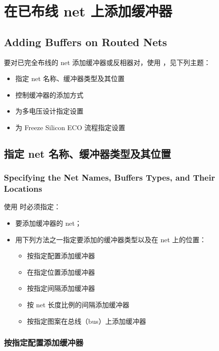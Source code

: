 \section{在已布线 net 上添加缓冲器}
\subsection*{Adding Buffers on Routed Nets}

要对已完全布线的 net 添加缓冲器或反相器对，使用 ，见下列主题：
\begin{itemize}
  \item 指定 net 名称、缓冲器类型及其位置
  \item 控制缓冲器的添加方式
  \item 为多电压设计指定设置
  \item 为 Freeze Silicon ECO 流程指定设置
\end{itemize}

\subsection{指定 net 名称、缓冲器类型及其位置}
\subsubsection*{Specifying the Net Names, Buffers Types, and Their Locations}

使用  时必须指定：
\begin{itemize}
  \item 要添加缓冲器的 net；
  \item 用下列方法之一指定要添加的缓冲器类型以及在 net 上的位置：
  \begin{itemize}
    \item 按指定配置添加缓冲器
    \item 在指定位置添加缓冲器
    \item 按指定间隔添加缓冲器
    \item 按 net 长度比例的间隔添加缓冲器
    \item 按指定图案在总线（bus）上添加缓冲器
  \end{itemize}
\end{itemize}

\subsubsection{按指定配置添加缓冲器}
